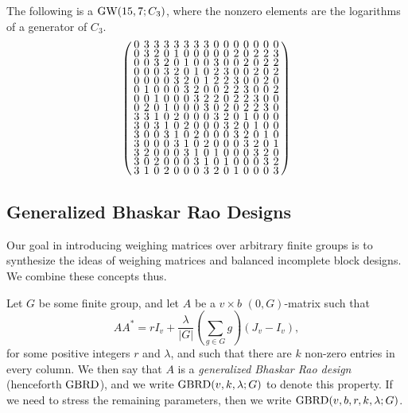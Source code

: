 \documentclass[../../../main]{subfiles}
\begin{document}
 \begin{ex}\label{bgw(15,7,3)1}
  The following is a $\text{GW}(15,7;C_3)$, where the nonzero elements are the logarithms of a generator of $C_3$.
  \begin{equation}\label{gw-ex}
  \arraycolsep=2.0pt\def\arraystretch{0.5}
\left(\begin{array}{ccccccccccccccc}
0&3&3&3&3&3&3&3&0&0&0&0&0&0&0\\
0&3&2&0&1&0&0&0&0&0&2&0&2&2&3\\
0&0&3&2&0&1&0&0&3&0&0&2&0&2&2\\
0&0&0&3&2&0&1&0&2&3&0&0&2&0&2\\
0&0&0&0&3&2&0&1&2&2&3&0&0&2&0\\
0&1&0&0&0&3&2&0&0&2&2&3&0&0&2\\
0&0&1&0&0&0&3&2&2&0&2&2&3&0&0\\
0&2&0&1&0&0&0&3&0&2&0&2&2&3&0\\
3&3&1&0&2&0&0&0&3&2&0&1&0&0&0\\
3&0&3&1&0&2&0&0&0&3&2&0&1&0&0\\
3&0&0&3&1&0&2&0&0&0&3&2&0&1&0\\
3&0&0&0&3&1&0&2&0&0&0&3&2&0&1\\
3&2&0&0&0&3&1&0&1&0&0&0&3&2&0\\
3&0&2&0&0&0&3&1&0&1&0&0&0&3&2\\
3&1&0&2&0&0&0&3&2&0&1&0&0&0&3
\end{array}\right)
  \end{equation}
 \end{ex}
 
 \dinkus
 
 \subsection{Generalized Bhaskar Rao Designs}
 
 Our goal in introducing weighing matrices over arbitrary finite groups is to synthesize the ideas of weighing matrices and balanced incomplete block designs. We combine these concepts thus.
 
 \begin{defin}\label{gbrd definition}
  Let $G$ be some finite group, and let $A$ be a $v \times b$ $(0,G)$-matrix such that
  \begin{equation}\label{gbrd-eq}
  AA^* = rI_v + \frac{\lambda}{|G|}\left(\sum_{g \in G}g\right)(J_v - I_v),
  \end{equation}
  for some positive integers $r$ and $\lambda$, and such that there are $k$ non-zero entries in every column. We then say that $A$ is a {\it generalized Bhaskar Rao design} (henceforth $\text{GBRD}$), and we write $\text{GBRD}(v,k,\lambda;G)$ to denote this property. If we need to stress the remaining parameters, then we write $\text{GBRD}(v,b,r,k,\lambda;G)$.
 \end{defin}
 
\end{document}
